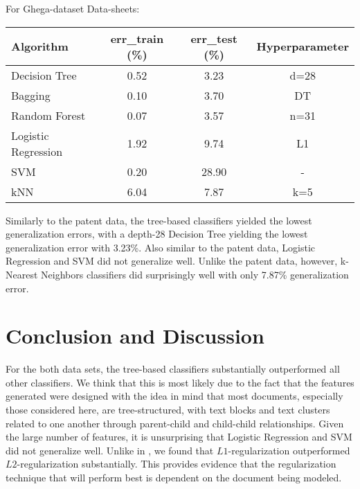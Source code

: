\documentclass[twoside,11pt]{article}
\renewcommand{\>}{{\rightarrow}}
\newcommand{\1}{{\mathbf 1}}
\newcommand{\0}{{\mathbf 0}}
\begin{document}
For Ghega-dataset Data-sheets:
\begin{center}
    \centering
    \begin{tabular}{|l|c|c|c|}
    \hline
    \textbf{Algorithm}     & \textbf{err\_train (\%)} & \textbf{err\_test (\%)} & \textbf{Hyperparameter} \\
    \hline
    Decision Tree          & 0.52   & 3.23    & d=28  \\
    \hline
    Bagging                & 0.10   & 3.70    & DT \\
    \hline
    Random Forest          & 0.07   & 3.57    & n=31  \\
    \hline
    Logistic Regression    & 1.92   & 9.74   & L1    \\
    \hline
    SVM                    & 0.20   & 28.90   & -   \\
    \hline
    kNN                    & 6.04   & 7.87   & k=5   \\
    \hline  
    \end{tabular}
\end{center}

Similarly to the patent data, the tree-based classifiers yielded the lowest generalization errors, with a depth-28 Decision Tree yielding the lowest generalization error with 3.23\%. Also similar to the patent data, Logistic Regression and SVM did not generalize well. Unlike the patent data, however, k-Nearest Neighbors classifiers did surprisingly well with only 7.87\% generalization error.


\section{Conclusion and Discussion}
For the both data sets, the tree-based classifiers substantially outperformed all other classifiers. We think that this is most likely due to the fact that the features generated were designed with the idea in mind that most documents, especially those considered here, are tree-structured, with text blocks and text clusters related to one another through parent-child and child-child relationships. Given the large number of features, it is unsurprising that Logistic Regression and SVM did not generalize well. Unlike in \cite{LiuWanZhang2016}, we found that $L1$-regularization outperformed $L2$-regularization substantially. This provides evidence that the regularization technique that will perform best is dependent on the document being modeled.
\end{document}
